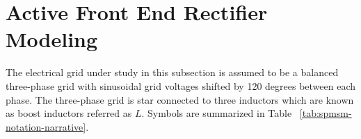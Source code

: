 

\graphicspath{{./Chapters/CH2/Pictures/}}

\let\cleardoublepage\clearpage

\section{Active Front End Rectifier Modeling}

The electrical grid under study in this subsection is assumed to be a balanced three-phase grid with sinusoidal grid voltages shifted by 120 degrees between each phase. The three-phase grid is star connected to three inductors which are known as boost inductors referred as $L$. Symbols are summarized in Table ~\ref{tab:spmsm-notation-narrative}.

